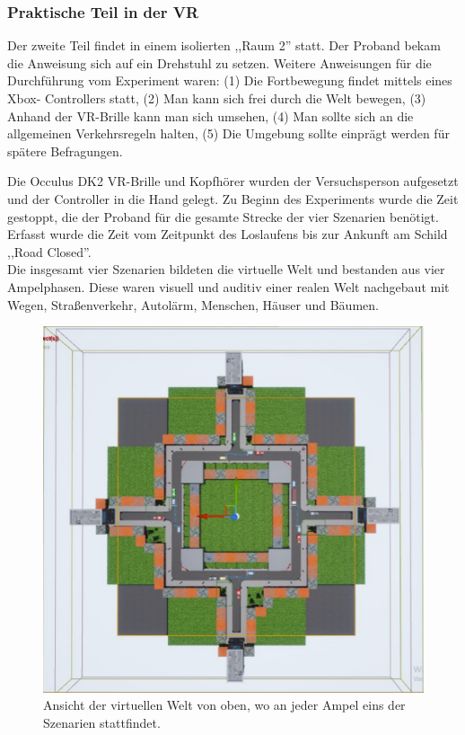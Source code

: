 \documentclass{Paper}
\begin{document}
\subsubsection{Praktische Teil in der VR}
Der zweite Teil findet in einem isolierten ,,Raum 2'' statt. Der Proband
bekam die Anweisung sich auf ein Drehstuhl zu setzen. Weitere Anweisungen für die
Durchführung vom Experiment waren: (1) Die Fortbewegung findet mittels eines Xbox-
Controllers statt, (2) Man kann sich frei durch die Welt bewegen, (3) Anhand der VR-Brille
kann man sich umsehen, (4) Man sollte sich an die allgemeinen Verkehrsregeln halten, (5)
Die Umgebung sollte einprägt werden für spätere Befragungen.
\par
Die Occulus DK2 VR-Brille und Kopfhörer wurden der Versuchsperson aufgesetzt und der Controller in die Hand gelegt. Zu Beginn des Experiments wurde die Zeit gestoppt, die der Proband für die
gesamte Strecke der vier Szenarien benötigt. Erfasst wurde die Zeit vom Zeitpunkt des Loslaufens bis zur Ankunft am Schild ,,Road Closed''. \\
Die insgesamt vier Szenarien bildeten die
virtuelle Welt und bestanden aus vier Ampelphasen. Diese waren visuell und auditiv einer
realen Welt nachgebaut mit Wegen, Straßenverkehr, Autolärm, Menschen, Häuser und
Bäumen. 

\begin{figure}[H]
\centering
\includegraphics[scale=0.6]{bilder/map.png}
\caption{Ansicht der virtuellen Welt von oben, wo an jeder Ampel eins der Szenarien stattfindet.}
\end{figure}
\end{document}
